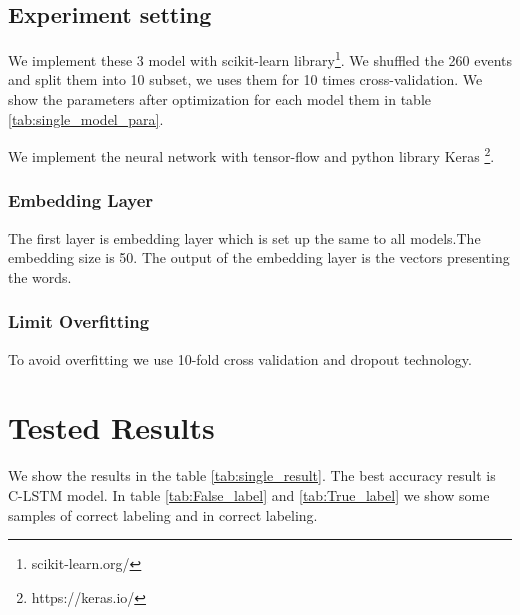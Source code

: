 \subsection{Experiment setting}
 We implement these 3 model with scikit-learn library\footnote{scikit-learn.org/}. We shuffled the 260 events and split them into 10 subset, we uses them for 10 times cross-validation. We show the parameters after optimization for each model them in table \ref{tab:single_model_para}.

\begin{table}[!h]
 \centering
{}
 \caption{Parameters of Classification models}
 \label{tab:single_model_para}
\end{table}
We implement the neural network with tensor-flow and python library Keras \footnote{https://keras.io/}.
 \subsubsection{Embedding Layer}  
 The first layer is embedding layer which is set up the same to all models.The embedding size is 50. The output of the embedding layer is the vectors presenting the words. 
 \subsubsection{Limit Overfitting}  
 To avoid overfitting we use 10-fold cross validation and dropout technology.
 
  \section{Tested Results}  
  We show the results in the table \ref{tab:single_result}. 
   The best accuracy result is C-LSTM model. In table \ref{tab:False_label} and \ref{tab:True_label} we show some samples of correct labeling and in correct labeling.

